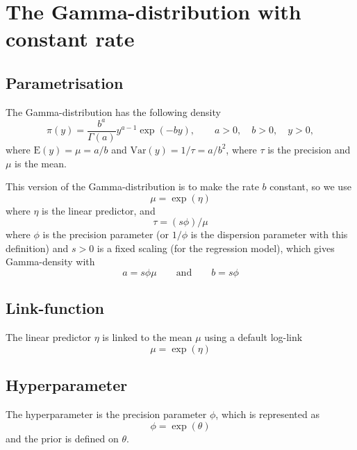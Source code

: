 \documentclass[a4paper,11pt]{article}
\begin{document}
\section*{The Gamma-distribution with constant rate}

\subsection*{Parametrisation}

The Gamma-distribution has the following density
\begin{displaymath}
    \pi(y) = \frac{b^{a}}{\Gamma(a)} y^{a-1} \exp(-by), \qquad a>0,
    \quad b>0, \quad y >0,
\end{displaymath}
where $\text{E}(y) = \mu = a/b$ and $\text{Var}(y) = 1/\tau = a/b^{2}$,
where $\tau$ is the precision and $\mu$ is the mean.

This version of the Gamma-distribution is to make the rate $b$
constant, so we use
\begin{displaymath}
    \mu = \exp(\eta)
\end{displaymath}
where $\eta$ is the linear predictor, and 
\begin{displaymath}
    \tau = (s \phi) / \mu
\end{displaymath}
where $\phi$ is the precision parameter (or $1/\phi$ is the dispersion
parameter with this definition) and $s>0$ is a fixed scaling (for the
regression model), which gives Gamma-density with
\begin{displaymath}
    a = s \phi \mu \qquad\mbox{and}\qquad b= s\phi
\end{displaymath}

\subsection*{Link-function}

The linear predictor $\eta$ is linked to the mean $\mu$ using a
default log-link
\begin{displaymath}
    \mu = \exp(\eta)
\end{displaymath}

\subsection*{Hyperparameter}

The hyperparameter is the precision parameter $\phi$, which is
represented as
\begin{displaymath}
    \phi = \exp(\theta)
\end{displaymath}
and the prior is defined on $\theta$.
\end{document}
